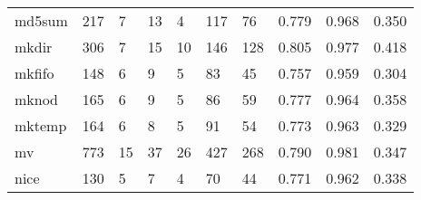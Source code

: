 \begin{longtable}{lp{1.3cm}p{1.3cm}p{1.3cm}p{1.3cm}p{1.3cm}p{1.3cm}p{1.3cm}p{1.3cm}p{1.3cm}}
md5sum    &                    217 &                                  7 &                                13 &                                4 &                               117 &                              76 &                                   0.779 &                                  0.968 &                                0.350 \\
mkdir     &                    306 &                                  7 &                                15 &                               10 &                               146 &                             128 &                                   0.805 &                                  0.977 &                                0.418 \\
mkfifo    &                    148 &                                  6 &                                 9 &                                5 &                                83 &                              45 &                                   0.757 &                                  0.959 &                                0.304 \\
mknod     &                    165 &                                  6 &                                 9 &                                5 &                                86 &                              59 &                                   0.777 &                                  0.964 &                                0.358 \\
mktemp    &                    164 &                                  6 &                                 8 &                                5 &                                91 &                              54 &                                   0.773 &                                  0.963 &                                0.329 \\
mv        &                    773 &                                 15 &                                37 &                               26 &                               427 &                             268 &                                   0.790 &                                  0.981 &                                0.347 \\
nice      &                    130 &                                  5 &                                 7 &                                4 &                                70 &                              44 &                                   0.771 &                                  0.962 &                                0.338 \\

\end{longtable}
